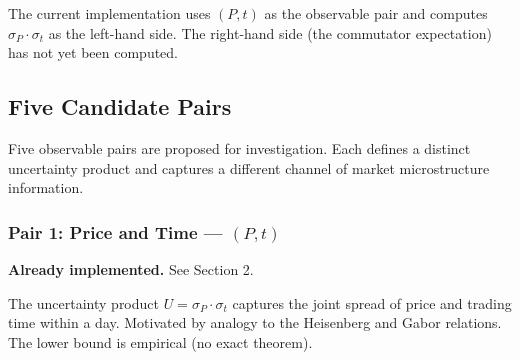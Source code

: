 \documentclass[preprint,12pt]{elsarticle}
\begin{document}
The current implementation uses $(P, t)$ as the observable pair and computes $\sigma_P \cdot \sigma_t$ as the left-hand side. The right-hand side (the commutator expectation) has not yet been computed.

\subsection{Five Candidate Pairs}

Five observable pairs are proposed for investigation. Each defines a distinct uncertainty product and captures a different channel of market microstructure information.

\begin{table}[htbp]
\centering
\caption{Candidate Robertson pairs, their market interpretation, and data requirements}
\end{table}

\subsubsection{Pair 1: Price and Time --- $(P, t)$}

\textbf{Already implemented.} See Section 2.

The uncertainty product $U = \sigma_P \cdot \sigma_t$ captures the joint spread of price and trading time within a day. Motivated by analogy to the Heisenberg and Gabor relations. The lower bound is empirical (no exact theorem).
\end{document}
